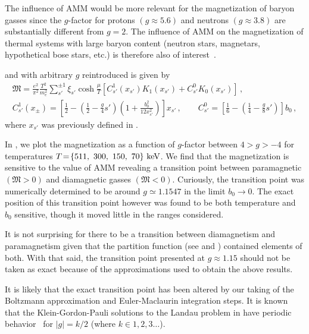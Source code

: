 The influence of AMM would be more relevant for the magnetization of baryon gasses since the $g$-factor for protons $(g\approx5.6)$ and neutrons $(g\approx3.8)$ are substantially different from $g\!=\!2$. The influence of AMM on the magnetization of thermal systems with large baryon content (neutron stars, magnetars, hypothetical bose stars, etc.) is therefore also of interest~\cite{Ferrer:2019xlr,Ferrer:2023pgq}.

 and  with arbitrary $g$ reintroduced is given by
\begin{gather}
\label{arbg:1}
{\mathfrak M}=\frac{e^{2}}{\pi^{2}}\frac{T^{2}}{m_{e}^{2}}\sum_{s'}^{\pm1}\xi_{s'}\cosh{\frac{\mu}{T}}
\left[C^{1}_{s'}(x_{s'})K_{1}(x_{s'})+C^{0}_{s'}K_{0}(x_{s'})\right]\,,\\
\label{arbg:2}
C^{1}_{s'}(x_{\pm}) = \left[\frac{1}{2}-\left(\frac{1}{2}-\frac{g}{4}s'\right)\left(1+\frac{b^2_0}{12x^{2}_{s'}}\right)\right]x_{s'}\,,\qquad
C^{0}_{s'} = \left[\frac{1}{6}-\left(\frac{1}{4}-\frac{g}{8}s'\right)\right]b_0\,,
\end{gather}
where $x_{s'}$ was previously defined in .

In , we plot the magnetization as a function of $g$-factor between $4>g>-4$ for temperatures $T\!=\!\{511,\ 300,\ 150,\ 70\}\keV$. We find that the magnetization is sensitive to the value of AMM revealing a transition point between paramagnetic $({\mathfrak M}>0)$ and diamagnetic gasses $({\mathfrak M}<0)$. Curiously, the transition point was numerically determined to be around $g\simeq1.1547$ in the limit $b_{0}\rightarrow0$. The exact position of this transition point however was found to be both temperature and $b_{0}$ sensitive, though it moved little in the ranges considered.

It is not surprising for there to be a transition between diamagnetism and paramagnetism given that the partition function (see  and ) contained elements of both. With that said, the transition point presented at $g\approx1.15$ should not be taken as exact because of the approximations used to obtain the above results. 

It is likely that the exact transition point has been altered by our taking of the Boltzmann approximation and Euler-Maclaurin integration steps. It is known that the Klein-Gordon-Pauli solutions to the Landau problem in  have periodic behavior~\cite{Steinmetz:2018ryf,Evans:2022fsu,Rafelski:2022bsv} for $|g|=k/2$ (where $k\in1,2,3\ldots$).

